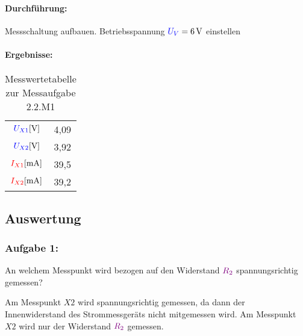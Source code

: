 \documentclass[a4paper,titlepage,parskip]{scrreprt}
\newcommand{\spannung}[1]{\textcolor{blue}{#1}}
\newcommand{\strom}[1]{\textcolor{red}{#1}}
\newcommand{\widerstand}[1]{\textcolor{violet}{#1}}
\begin{document}
            \paragraph{Durchführung:} Messschaltung aufbauen. Betriebsspannung $\spannung{U_V} = \SI{6}{\volt}$ einstellen
            \pagebreak
            \paragraph{Ergebnisse:}
                 \begin{center}
                    \begin{table}[!hbtp]
                        \caption{Messwertetabelle zur Messaufgabe 2.2.M1}
                        \label{tbl:messergebnisse2.1}
                        \renewcommand{\arraystretch}{1.3}
                        \begin{center}
                            \begin{tabular}{c|c}
                                $\spannung{U_{X1}} [\si{\volt}]$ & 4,09\\
                                $\spannung{U_{X2}} [\si{\volt}]$ & 3,92\\ \hline
                                $\strom{I_{X1}} [\si{\milli\ampere}]$ & 39,5\\
                                $\strom{I_{X2}} [\si{\milli\ampere}]$ & 39,2
                            \end{tabular}
                        \end{center}
                    \end{table}
                \end{center}
            
        \subsection{Auswertung}
            \subsubsection{Aufgabe 1:}  An welchem Messpunkt wird bezogen auf den Widerstand $\widerstand{R_2}$ spannungsrichtig gemessen?
            
            Am Messpunkt $X2$ wird spannungsrichtig gemessen, da dann der Innenwiderstand des Strommessgeräts nicht mitgemessen wird. Am Messpunkt $X2$ wird nur der Widerstand $\widerstand{R_2}$ gemessen.
            
            
\end{document}
